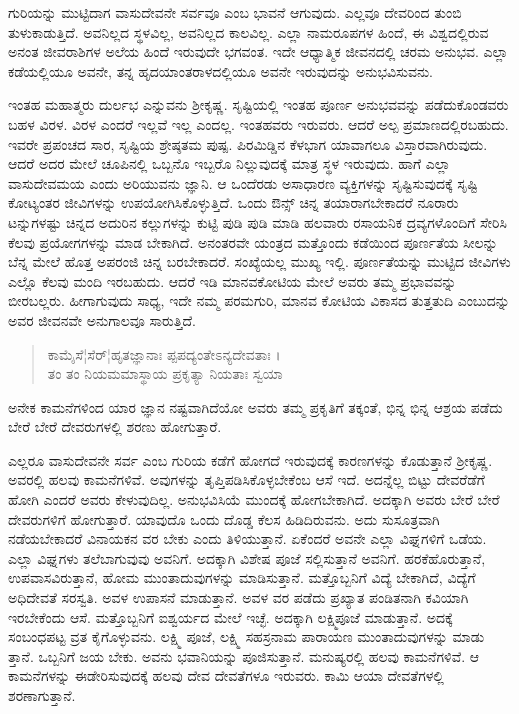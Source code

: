 ಗುರಿಯನ್ನು ಮುಟ್ಟಿದಾಗ ವಾಸುದೇವನೇ ಸರ್ವವೂ ಎಂಬ ಭಾವನೆ ಆಗುವುದು. ಎಲ್ಲವೂ ದೇವರಿಂದ ತುಂಬಿ ತುಳುಕಾಡುತ್ತಿದೆ. ಅವನಿಲ್ಲದ ಸ್ಥಳವಿಲ್ಲ, ಅವನಿಲ್ಲದ ಕಾಲವಿಲ್ಲ. ಎಲ್ಲಾ ನಾಮರೂಪಗಳ ಹಿಂದೆ, ಈ ವಿಶ್ವದಲ್ಲಿರುವ ಅನಂತ ಜೀವರಾಶಿಗಳ ಅಲೆಯ ಹಿಂದೆ ಇರುವುದೇ ಭಗವಂತ. ಇದೇ ಆಧ್ಯಾತ್ಮಿಕ ಜೀವನದಲ್ಲಿ ಚರಮ ಅನುಭವ. ಎಲ್ಲಾ ಕಡೆಯಲ್ಲಿಯೂ ಅವನೇ, ತನ್ನ ಹೃದಯಾಂತರಾಳದಲ್ಲಿಯೂ ಅವನೇ ಇರುವುದನ್ನು ಅನುಭವಿಸುವನು.

ಇಂತಹ ಮಹಾತ್ಮರು ದುರ್ಲಭ ಎನ್ನುವನು ಶ್ರೀಕೃಷ್ಣ. ಸೃಷ್ಟಿಯಲ್ಲಿ ಇಂತಹ ಪೂರ್ಣ ಅನುಭವವನ್ನು ಪಡೆದುಕೊಂಡವರು ಬಹಳ ವಿರಳ. ವಿರಳ ಎಂದರೆ ಇಲ್ಲವೆ ಇಲ್ಲ ಎಂದಲ್ಲ. ಇಂತಹವರು ಇರುವರು. ಆದರೆ ಅಲ್ಪ ಪ್ರಮಾಣದಲ್ಲಿರಬಹುದು. ಇವರೇ ಪ್ರಪಂಚದ ಸಾರ, ಸೃಷ್ಟಿಯ ಶ್ರೇಷ್ಠತಮ ಪುಷ್ಪ. ಪಿರಮಿಡ್ಡಿನ ಕೆಳಭಾಗ ಯಾವಾಗಲೂ ವಿಸ್ತಾರವಾಗಿರುವುದು. ಆದರೆ ಅದರ ಮೇಲೆ ಚೂಪಿನಲ್ಲಿ ಒಬ್ಬನೊ ಇಬ್ಬರೊ ನಿಲ್ಲುವುದಕ್ಕೆ ಮಾತ್ರ ಸ್ಥಳ ಇರುವುದು. ಹಾಗೆ ಎಲ್ಲಾ ವಾಸುದೇವಮಯ ಎಂದು ಅರಿಯುವನು ಜ್ಞಾನಿ. ಆ ಒಂದೆರಡು ಅಸಾಧಾರಣ ವ್ಯಕ್ತಿಗಳನ್ನು ಸೃಷ್ಟಿಸುವುದಕ್ಕೆ ಸೃಷ್ಟಿ ಕೋಟ್ಯಂತರ ಜೀವಿಗಳನ್ನು ಉಪಯೋಗಿಸಿಕೊಳ್ಳುತ್ತಿದೆ. ಒಂದು ಔನ್ಸ್ ಚಿನ್ನ ತಯಾರಾಗಬೇಕಾದರೆ ನೂರಾರು ಟನ್ನುಗಳಷ್ಟು ಚಿನ್ನದ ಅದುರಿನ ಕಲ್ಲುಗಳನ್ನು ಕುಟ್ಟಿ ಪುಡಿ ಪುಡಿ ಮಾಡಿ ಹಲವಾರು ರಸಾಯನಿಕ ದ್ರವ್ಯಗಳೊಂದಿಗೆ ಸೇರಿಸಿ ಕೆಲವು ಪ್ರಯೋಗಗಳನ್ನು ಮಾಡ ಬೇಕಾಗಿದೆ. ಅನಂತರವೇ ಯಂತ್ರದ ಮತ್ತೊಂದು ಕಡೆಯಿಂದ ಪೂರ್ಣತೆಯ ಸೀಲನ್ನು ಬೆನ್ನ ಮೇಲೆ ಹೊತ್ತ ಅಪರಂಜಿ ಚಿನ್ನ ಬರಬೇಕಾದರೆ. ಸಂಖ್ಯೆಯಲ್ಲ ಮುಖ್ಯ ಇಲ್ಲಿ. ಪೂರ್ಣತೆಯನ್ನು ಮುಟ್ಟಿದ ಜೀವಿಗಳು ಎಲ್ಲೊ ಕೆಲವು ಮಂದಿ ಇರಬಹುದು. ಆದರೆ ಇಡಿ ಮಾನವಕೋಟಿಯ ಮೇಲೆ ಅವರು ತಮ್ಮ ಪ್ರಭಾವವನ್ನು ಬೀರಬಲ್ಲರು. ಹೀಗಾಗುವುದು ಸಾಧ್ಯ, ಇದೇ ನಮ್ಮ ಪರಮಗುರಿ, ಮಾನವ ಕೋಟಿಯ ವಿಕಾಸದ ತುತ್ತತುದಿ ಎಂಬುದನ್ನು ಅವರ ಜೀವನವೇ ಅನುಗಾಲವೂ ಸಾರುತ್ತಿದೆ.

\begin{verse}
ಕಾಮೈಸೆ¦ಸೆರ್¦ಹೃತಜ್ಞಾನಾಃ ಪ್ಪಪದ್ಯಂತೇಽನ್ಯದೇವತಾಃ ।\\ತಂ ತಂ ನಿಯಮಮಾಸ್ಥಾಯ ಪ್ರಕೃತ್ಯಾ ನಿಯತಾಃ ಸ್ವಯಾ 
\end{verse}

{\small ಅನೇಕ ಕಾಮನೆಗಳಿಂದ ಯಾರ ಜ್ಞಾನ ನಷ್ಟವಾಗಿದೆಯೋ ಅವರು ತಮ್ಮ ಪ್ರಕೃತಿಗೆ ತಕ್ಕಂತೆ, ಭಿನ್ನ ಭಿನ್ನ ಆಶ್ರಯ ಪಡೆದು ಬೇರೆ ಬೇರೆ ದೇವರುಗಳಲ್ಲಿ ಶರಣು ಹೋಗುತ್ತಾರೆ.}

ಎಲ್ಲರೂ ವಾಸುದೇವನೇ ಸರ್ವ ಎಂಬ ಗುರಿಯ ಕಡೆಗೆ ಹೋಗದೆ ಇರುವುದಕ್ಕೆ ಕಾರಣಗಳನ್ನು ಕೊಡುತ್ತಾನೆ ಶ್ರೀಕೃಷ್ಣ. ಅವರಲ್ಲಿ ಹಲವು ಕಾಮನೆಗಳಿವೆ. ಅವುಗಳನ್ನು ತೃಪ್ತಿಪಡಿಸಿಕೊಳ್ಳಬೇಕೆಂಬ ಆಸೆ ಇದೆ. ಅದನ್ನೆಲ್ಲ ಬಿಟ್ಟು ದೇವರೆಡೆಗೆ ಹೋಗಿ ಎಂದರೆ ಅವರು ಕೇಳುವುದಿಲ್ಲ. ಅನುಭವಿಸಿಯೆ ಮುಂದಕ್ಕೆ ಹೋಗಬೇಕಾಗಿದೆ. ಅದಕ್ಕಾಗಿ ಅವರು ಬೇರೆ ಬೇರೆ ದೇವರುಗಳಿಗೆ ಹೋಗುತ್ತಾರೆ. ಯಾವುದೊ ಒಂದು ದೊಡ್ಡ ಕೆಲಸ ಹಿಡಿದಿರುವನು. ಅದು ಸುಸೂತ್ರವಾಗಿ ನಡೆಯಬೇಕಾದರೆ ವಿನಾಯಕನ ವರ ಬೇಕು ಎಂದು ತಿಳಿಯುತ್ತಾನೆ. ಏಕೆಂದರೆ ಅವನೇ ಎಲ್ಲಾ ವಿಘ್ನಗಳಿಗೆ ಒಡೆಯ. ಎಲ್ಲಾ ವಿಘ್ನಗಳು ತಲೆಬಾಗುವುವು ಅವನಿಗೆ. ಅದಕ್ಕಾಗಿ ವಿಶೇಷ ಪೂಜೆ ಸಲ್ಲಿಸುತ್ತಾನೆ ಅವನಿಗೆ. ಹರಕೆಹೊರುತ್ತಾನೆ, ಉಪವಾಸವಿರುತ್ತಾನೆ, ಹೋಮ ಮುಂತಾದುವುಗಳನ್ನು ಮಾಡಿಸುತ್ತಾನೆ. ಮತ್ತೊಬ್ಬನಿಗೆ ವಿದ್ಯೆ ಬೇಕಾಗಿದೆ, ವಿದ್ಯೆಗೆ ಅಧಿದೇವತೆ ಸರಸ್ವತಿ. ಅವಳ ಉಪಾಸನೆ ಮಾಡುತ್ತಾನೆ. ಅವಳ ವರ ಪಡೆದು ಪ್ರಖ್ಯಾತ ಪಂಡಿತನಾಗಿ ಕವಿಯಾಗಿ ಇರಬೇಕೆಂದು ಆಸೆ. ಮತ್ತೊಬ್ಬನಿಗೆ ಐಶ್ವರ್ಯದ ಮೇಲೆ ಇಚ್ಛೆ. ಅದಕ್ಕಾಗಿ ಲಕ್ಷ್ಮಿಪೂಜೆ ಮಾಡುತ್ತಾನೆ. ಅದಕ್ಕೆ ಸಂಬಂಧಪಟ್ಟ ವ್ರತ ಕೈಗೊಳ್ಳುವನು. ಲಕ್ಷ್ಮಿ ಪೂಜೆ, ಲಕ್ಷ್ಮಿ ಸಹಸ್ರನಾಮ ಪಾರಾಯಣ ಮುಂತಾದುವುಗಳನ್ನು ಮಾಡು ತ್ತಾನೆ. ಒಬ್ಬನಿಗೆ ಜಯ ಬೇಕು. ಅವನು ಭವಾನಿಯನ್ನು ಪೂಜಿಸುತ್ತಾನೆ. ಮನುಷ್ಯರಲ್ಲಿ ಹಲವು ಕಾಮನೆಗಳಿವೆ. ಆ ಕಾಮನೆಗಳನ್ನು ಈಡೇರಿಸುವುದಕ್ಕೆ ಹಲವು ದೇವ ದೇವತೆಗಳೂ ಇರುವರು. ಕಾಮಿ ಆಯಾ ದೇವತೆಗಳಲ್ಲಿ ಶರಣಾಗುತ್ತಾನೆ.

